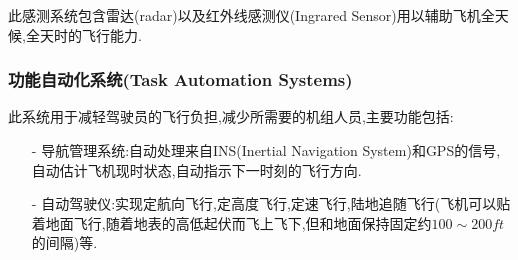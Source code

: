 \documentclass[9pt, oneside]{book}
\begin{document}
此感测系统包含雷达(radar)以及红外线感测仪(Ingrared Sensor)用以辅助飞机全天候,全天时的飞行能力.

\subsubsection{功能自动化系统(Task Automation Systems)}

此系统用于减轻驾驶员的飞行负担,减少所需要的机组人员,主要功能包括:

\begin{itemize}
    \item [-] 导航管理系统:自动处理来自INS(Inertial Navigation System)和GPS的信号,自动估计飞机现时状态,自动指示下一时刻的飞行方向.
    \item [-] 自动驾驶仪:实现定航向飞行,定高度飞行,定速飞行,陆地追随飞行(飞机可以贴着地面飞行,随着地表的高低起伏而飞上飞下,但和地面保持固定约$100\sim 200ft$的间隔)等.
\end{itemize}
\end{document}
